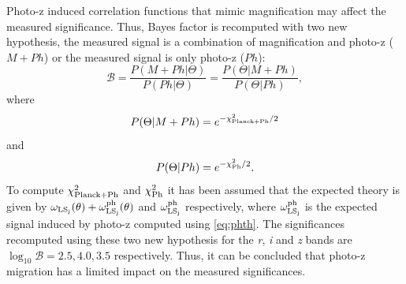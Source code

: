 Photo-z induced correlation functions that mimic magnification may affect the measured significance. Thus, Bayes factor is recomputed with two new hypothesis, the measured signal is a combination of magnification and photo-z ($M+Ph$) or the measured signal is only photo-z ($Ph$):
\begin{equation}
\mathcal{B} = \frac{P(M+Ph|\Theta)}{P(Ph|\Theta)} = \frac{P(\Theta|M+Ph)}{P(\Theta|Ph)},
\end{equation}
where
\begin{equation}
P(\Theta|M+Ph) = e^{-\chi^2_{\rm Planck+Ph}/2}
\end{equation}
and
\begin{equation}
P(\Theta|Ph) = e^{-\chi^2_{\rm Ph}/2}.
\end{equation}
To compute $\chi^2_{\rm Planck+Ph}$ and $\chi^2_{\rm Ph}$ it has been assumed that the expected theory is given by $\omega_{\rm LS_j}(\theta)+\omega_{\rm LS_j}^{\rm ph}(\theta)$ and $\omega_{\rm LS_j}^{\rm ph}$ respectively, where $\omega_{\rm LS_j}^{\rm ph}$ is the expected signal induced by photo-z computed using \autoref{eq:phth}. The significances recomputed using these two new hypothesis for the {\it r}, {\it i} and {\it z} bands are $\log_{10}\mathcal{B}=2.5, 4.0, 3.5$ respectively. Thus, it can be concluded that photo-z migration has a limited impact on the measured significances.
\newline

